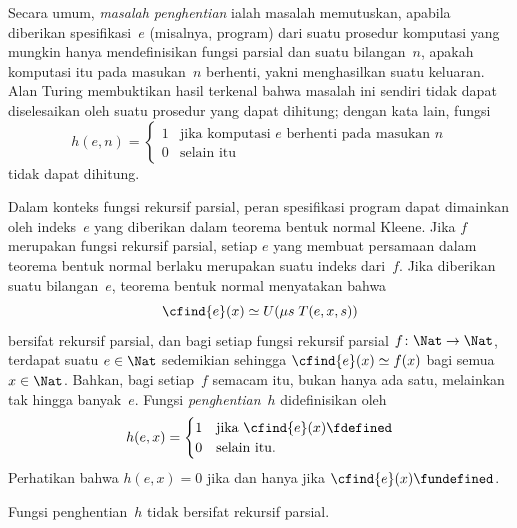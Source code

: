 \documentclass[../../../include/open-logic-section]{subfiles}
\begin{document}

Secara umum, \emph{masalah penghentian} ialah masalah memutuskan, apabila
diberikan spesifikasi~$e$ (misalnya, program) dari suatu prosedur komputasi
yang mungkin hanya mendefinisikan fungsi parsial dan suatu bilangan~$n$, apakah
komputasi itu pada masukan~$n$ berhenti, yakni menghasilkan suatu keluaran.
Alan Turing membuktikan hasil terkenal bahwa masalah ini sendiri tidak dapat
diselesaikan oleh suatu prosedur yang dapat dihitung;
dengan kata lain, fungsi
\[
h(e, n) =
\begin{cases}
1 & \text{jika komputasi $e$ berhenti pada masukan $n$}\\
0 & \text{selain itu}
\end{cases}
\]
tidak dapat dihitung.

Dalam konteks fungsi rekursif parsial, peran spesifikasi program dapat
dimainkan oleh indeks~$e$ yang diberikan dalam teorema bentuk normal Kleene.
Jika $f$ merupakan fungsi rekursif parsial, setiap $e$ yang membuat persamaan
dalam teorema bentuk normal berlaku merupakan suatu indeks dari~$f$. Jika
diberikan suatu bilangan~$e$, teorema bentuk normal menyatakan bahwa
\[
\cfind{e}(x) \simeq U(\mu s \; T(e, x, s))
\]
bersifat rekursif parsial, dan bagi setiap fungsi rekursif parsial
$f\colon\Nat\to\Nat$, terdapat suatu $e\in\Nat$ sedemikian sehingga
$\cfind{e}(x)\simeq f(x)$ bagi semua~$x\in\Nat$. Bahkan, bagi setiap~$f$
semacam itu, bukan hanya ada satu, melainkan tak hingga banyak~$e$. Fungsi
\emph{penghentian}~$h$ didefinisikan oleh
\[
h(e, x) =
\begin{cases}
1 & \text{jika $\cfind{e}(x) \fdefined$}\\
0 & \text{selain itu.}
\end{cases}
\]
Perhatikan bahwa $h(e,x)=0$ jika dan hanya jika
$\cfind{e}(x)\fundefined$.

\begin{thm}
Fungsi penghentian~$h$ tidak bersifat rekursif parsial.
\end{thm}
\end{document}
